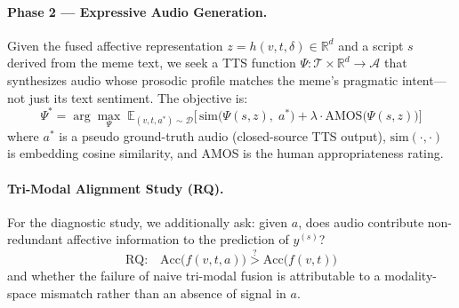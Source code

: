 \paragraph{Phase 2 — Expressive Audio Generation.}
Given the fused affective representation $z = h(v, t, \delta) \in \mathbb{R}^d$ and a script
$s$ derived from the meme text, we seek a TTS function
$\Psi: \mathcal{T} \times \mathbb{R}^d \rightarrow \mathcal{A}$
that synthesizes audio whose prosodic profile matches the meme's pragmatic intent—not just its text
sentiment. The objective is:
\begin{equation}
  \Psi^* = \arg\max_\Psi\; \mathbb{E}_{(v,t,a^*)\sim\mathcal{D}}\bigl[\,
    \text{sim}\bigl(\Psi(s,z),\; a^*\bigr) +
    \lambda\cdot\text{AMOS}\bigl(\Psi(s,z)\bigr)
  \bigr]
\end{equation}
where $a^*$ is a pseudo ground-truth audio (closed-source TTS output), $\text{sim}(\cdot,\cdot)$ is
embedding cosine similarity, and AMOS is the human appropriateness rating.

\paragraph{Tri-Modal Alignment Study (RQ).}
For the diagnostic study, we additionally ask: given $a$, does audio contribute non-redundant
affective information to the prediction of $y^{(s)}$?
\begin{equation}
  \text{RQ:}\quad \text{Acc}\bigl(f(v,t,a)\bigr) \overset{?}{>} \text{Acc}\bigl(f(v,t)\bigr)
\end{equation}
and whether the failure of naive tri-modal fusion is attributable to a modality-space mismatch rather
than an absence of signal in $a$.
